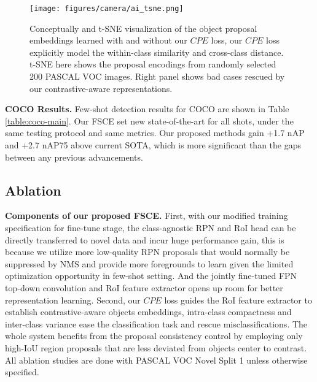 \documentclass[final]{cvpr}
\begin{document}
\begin{figure*}[h]
\begin{center}
\texttt{[image: figures/camera/ai\_tsne.png]}
\end{center}
\vspace{-2mm}
\caption{Conceptually and t-SNE visualization of the object proposal embeddings learned with and without our $CPE$ loss, our $CPE$ loss explicitly model the within-class similarity and cross-class distance. t-SNE here shows the proposal encodings from randomly selected 200 PASCAL VOC images. Right panel shows bad cases rescued by our contrastive-aware representations.} 
\label{fig:tsne}
\end{figure*}

\vspace{-2.5mm}
\textbf{COCO Results.} Few-shot detection results for COCO are shown in Table \ref{table:coco-main}. Our FSCE set new state-of-the-art for all shots, under the same testing protocol and same metrics. Our proposed methods gain +1.7 nAP and +2.7 nAP75 above current SOTA, which is more significant than the gaps between any previous advancements.





\subsection{Ablation}\label{ablation}

\textbf{Components of our proposed FSCE.} First, with our modified training specification for fine-tune stage, the class-agnostic RPN and RoI head can be directly transferred to novel data and incur huge performance gain, this is because we utilize more low-quality RPN proposals that would normally be suppressed by NMS and provide more foregrounds to learn given the limited optimization opportunity in few-shot setting. And the jointly fine-tuned FPN top-down convolution and RoI feature extractor opens up room for better representation learning. Second, our $CPE$ loss guides the RoI feature extractor to establish contrastive-aware objects embeddings, intra-class compactness and inter-class variance ease the classification task and rescue misclassifications. The whole system benefits from the proposal consistency control by employing only high-IoU region proposals that are less deviated from objects center to contrast. All ablation studies are done with PASCAL VOC Novel Split 1 unless otherwise specified.
\end{document}
